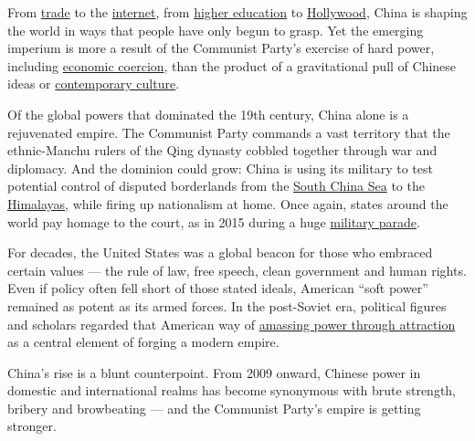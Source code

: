 From
\href{https://www.nytimes3xbfgragh.onion/2017/11/09/business/donald-trump-china-trade-xi-jinping.html}{trade}
to the
\href{https://www.nytimes3xbfgragh.onion/2017/08/17/business/dealbook/alibaba-sales-revenue-first-quarter-profit.html}{internet},
from
\href{https://www.nytimes3xbfgragh.onion/2017/02/02/magazine/the-parachute-generation.html}{higher
education} to
\href{https://www.nytimes3xbfgragh.onion/2015/04/29/world/asia/wang-jianlin-abillionaire-at-the-intersection-of-business-and-power-in-china.html}{Hollywood},
China is shaping the world in ways that people have only begun to grasp.
Yet the emerging imperium is more a result of the Communist Party's
exercise of hard power, including
\href{http://www.nytimes3xbfgragh.onion/2009/12/21/world/asia/21china.html}{economic
coercion}, than the product of a gravitational pull of Chinese ideas or
\href{http://www.nytimes3xbfgragh.onion/interactive/world/asia/culture-and-control-in-china-series.html}{contemporary
culture}.

Of the global powers that dominated the 19th century, China alone is a
rejuvenated empire. The Communist Party commands a vast territory that
the ethnic-Manchu rulers of the Qing dynasty cobbled together through
war and diplomacy. And the dominion could grow: China is using its
military to test potential control of disputed borderlands from the
\href{https://www.nytimes3xbfgragh.onion/2014/06/17/world/asia/spratly-archipelago-china-trying-to-bolster-its-claims-plants-islands-in-disputed-waters.html}{South
China Sea} to the
\href{https://www.nytimes3xbfgragh.onion/2017/07/26/world/asia/dolam-plateau-china-india-bhutan.html}{Himalayas},
while firing up nationalism at home. Once again, states around the world
pay homage to the court, as in 2015 during a huge
\href{https://www.nytimes3xbfgragh.onion/2015/09/03/world/asia/beijing-turns-into-ghost-town-as-it-gears-up-for-military-parade.html?_r=0}{military
parade}.

For decades, the United States was a global beacon for those who
embraced certain values --- the rule of law, free speech, clean
government and human rights. Even if policy often fell short of those
stated ideals, American ``soft power'' remained as potent as its armed
forces. In the post-Soviet era, political figures and scholars regarded
that American way of
\href{https://www.jstor.org/stable/1148580?seq=1\#page_scan_tab_contents}{amassing
power through attraction} as a central element of forging a modern
empire.

China's rise is a blunt counterpoint. From 2009 onward, Chinese power in
domestic and international realms has become synonymous with brute
strength, bribery and browbeating --- and the Communist Party's empire
is getting stronger.

